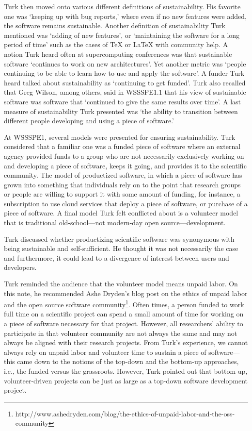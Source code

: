 \documentclass[11pt, oneside]{amsart}
\begin{document}
Turk then moved onto various different definitions of sustainability. His
favorite one was `keeping up with bug reports,' where even if no new features
were added, the software remains sustainable. Another definition of
sustainability Turk mentioned was `adding of new features', or `maintaining the
software for a long period of time' such as the cases of TeX or LaTeX with
community help. A notion Turk heard often at supercomputing conferences was that
sustainable software `continues to work on new architectures'. Yet another
metric was `people continuing to be able to learn how to use and apply the
software'. A funder Turk heard talked about sustainability as `continuing to get
funded'. Turk also recalled that Greg Wilson, among others, said in WSSSPE1.1
that his view of sustainable software was software that `continued to give the
same results over time'. A last measure of sustainability Turk presented was
`the ability to transition between different people developing and using a piece
of software.'

At WSSSPE1, several models were presented for ensuring sustainability. Turk
considered that a familiar one was a funded piece of software where an external
agency provided funds to a group who are not necessarily exclusively working on
and developing a piece of software, keeps it going, and provides it to the
scientific community. The model of productized software, in which a piece of
software has grown into something that individuals rely on to the point that
research groups or people are willing to support it with some amount of funding,
for instance, a subscription to use cloud services that deploy a piece of
software, or purchase of a piece of software. A final model Turk felt conflicted
about is a volunteer model that is traditional old-school---not modern-day open
source---development.

Turk discussed whether productizing scientific software was synonymous with
being sustainable and self-sufficient. He thought it was not necessarily the
case and furthermore, it could lead to a divergence of interest between users
and developers.

Turk reminded the audience that the volunteer model means unpaid labor. On this
note, he recommended Ashe Dryden's blog post on the
ethics of unpaid labor and the open source software
community\footnote{http://www.ashedryden.com/blog/the-ethics-of-unpaid-labor-and-the-oss-community}.
Often times, a person
funded to work full time on a scientific project can spend a small amount of
time for working on a piece of software necessary for that project. However, all
researchers' ability to participate in that volunteer community are not always
the same and may not always be aligned with their research projects. From Turk's
experience, we cannot always rely on unpaid labor and volunteer time to sustain
a piece of software---this came down to the notions of the top-down and the
bottom-up approaches, i.e., the funded versus the grassroots. However, Turk
pointed out that bottom-up, volunteer-driven projects can be just as large
as a top-down software development project.
\end{document}

